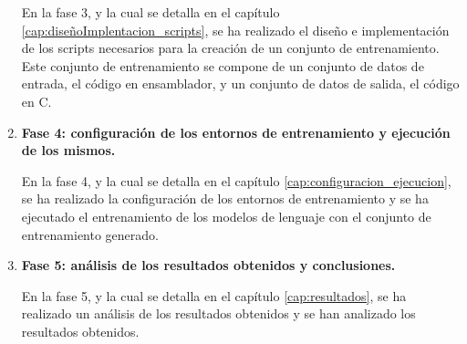 \begin{enumerate}
        En la fase 3, y la cual se detalla en el capítulo \ref{cap:diseñoImplentacion_scripts},
        se ha realizado el diseño e implementación de los scripts necesarios para la
        creación de un conjunto de entrenamiento. Este conjunto de entrenamiento se
        compone de un conjunto de datos de entrada, el código en ensamblador, y un conjunto
        de datos de salida, el código en C.

    \item \textbf{Fase 4: configuración de los entornos de entrenamiento y ejecución de
        los mismos.} 
        
        En la fase 4, y la cual se detalla en el capítulo \ref{cap:configuracion_ejecucion},
        se ha realizado la configuración de los entornos de entrenamiento y se ha ejecutado
        el entrenamiento de los modelos de lenguaje con el conjunto de entrenamiento generado.

    \item \textbf{Fase 5: análisis de los resultados obtenidos y conclusiones.} 

        En la fase 5, y la cual se detalla en el capítulo \ref{cap:resultados},
        se ha realizado un análisis de los resultados obtenidos y se han analizado
        los resultados obtenidos.
\end{enumerate}